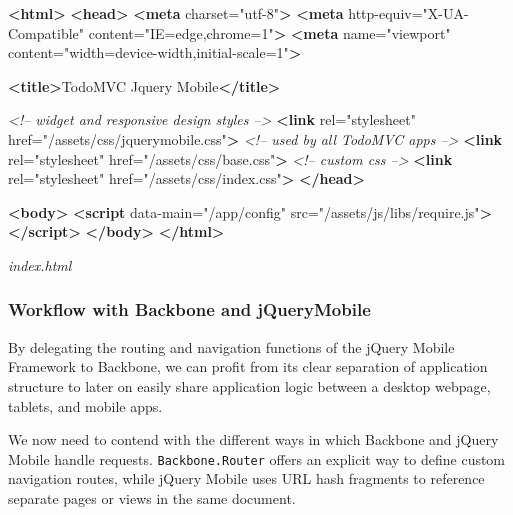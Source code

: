 \documentclass[9pt]{book}
\newenvironment{Shaded}{}{}
\newcommand{\KeywordTok}[1]{\textcolor[rgb]{0.00,0.44,0.13}{\textbf{{#1}}}}
\newcommand{\StringTok}[1]{\textcolor[rgb]{0.25,0.44,0.63}{{#1}}}
\newcommand{\CommentTok}[1]{\textcolor[rgb]{0.38,0.63,0.69}{\textit{{#1}}}}
\newcommand{\OtherTok}[1]{\textcolor[rgb]{0.00,0.44,0.13}{{#1}}}
\newcommand{\NormalTok}[1]{{#1}}
\begin{document}
\begin{Shaded}
\begin{Highlighting}[]
\KeywordTok{<html>}
\KeywordTok{<head>}
    \KeywordTok{<meta}\OtherTok{ charset=}\StringTok{"utf-8"}\KeywordTok{>}
    \KeywordTok{<meta}\OtherTok{ http-equiv=}\StringTok{"X-UA-Compatible"}\OtherTok{ content=}\StringTok{"IE=edge,chrome=1"}\KeywordTok{>}
    \KeywordTok{<meta}\OtherTok{ name=}\StringTok{"viewport"}\OtherTok{ content=}\StringTok{"width=device-width,initial-scale=1"}\KeywordTok{>}

    \KeywordTok{<title>}\NormalTok{TodoMVC Jquery Mobile}\KeywordTok{</title>}

\CommentTok{<!-- widget and responsive design styles -->}
    \KeywordTok{<link}\OtherTok{ rel=}\StringTok{"stylesheet"}\OtherTok{ href=}\StringTok{"/assets/css/jquerymobile.css"}\KeywordTok{>}
\CommentTok{<!-- used by all TodoMVC apps -->}
    \KeywordTok{<link}\OtherTok{ rel=}\StringTok{"stylesheet"}\OtherTok{ href=}\StringTok{"/assets/css/base.css"}\KeywordTok{>}
\CommentTok{<!-- custom css -->}
    \KeywordTok{<link}\OtherTok{ rel=}\StringTok{"stylesheet"}\OtherTok{ href=}\StringTok{"/assets/css/index.css"}\KeywordTok{>}
\KeywordTok{</head>}

\KeywordTok{<body>}
    \KeywordTok{<script}\OtherTok{ data-main=}\StringTok{"/app/config"}\OtherTok{ src=}\StringTok{"/assets/js/libs/require.js"}\KeywordTok{></script>}
\KeywordTok{</body>}
\KeywordTok{</html>}
\end{Highlighting}
\end{Shaded}

\emph{index.html}

\subsubsection{Workflow with Backbone and
jQueryMobile}\label{workflow-with-backbone-and-jquerymobile}

By delegating the routing and navigation functions of the jQuery Mobile
Framework to Backbone, we can profit from its clear separation of
application structure to later on easily share application logic between
a desktop webpage, tablets, and mobile apps.

We now need to contend with the different ways in which Backbone and
jQuery Mobile handle requests. \texttt{Backbone.Router} offers an
explicit way to define custom navigation routes, while jQuery Mobile
uses URL hash fragments to reference separate pages or views in the same
document.
\end{document}
